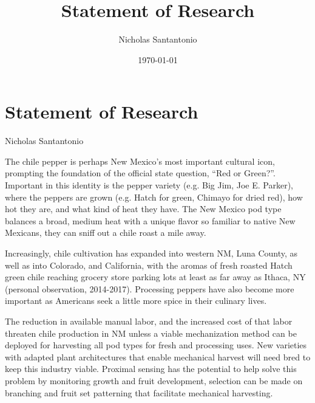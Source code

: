 \documentclass[11pt]{article}
\title{Statement of Research}
\author{Nicholas Santantonio}
\date{\today}
\begin{document}
\section*{\centering Statement of Research}
\begin{center} Nicholas Santantonio \end{center}







\noindent The chile pepper is perhaps New Mexico's most important cultural icon, prompting the foundation of the official state question, ``Red or Green?''. Important in this identity is the pepper variety (e.g. Big Jim, Joe E. Parker), where the peppers are grown (e.g. Hatch for green, Chimayo for dried red), how hot they are, and what kind of heat they have. The New Mexico pod type balances a broad, medium heat with a unique flavor so familiar to native New Mexicans, they can sniff out a chile roast a mile away. 

Increasingly, chile cultivation has expanded into western NM, Luna County, as well as into Colorado, and California, with the aromas of fresh roasted Hatch green chile reaching grocery store parking lots at least as far away as Ithaca, NY (personal observation, 2014-2017). Processing peppers have also become more important as Americans seek a little more spice in their culinary lives. 

The reduction in available manual labor, and the increased cost of that labor threaten chile production in NM unless a viable mechanization method can be deployed for harvesting all pod types for fresh and processing uses. New varieties with adapted plant architectures that enable mechanical harvest  will need bred to keep this industry viable. Proximal sensing has the potential to help solve this problem by monitoring growth and fruit development, selection can be made on branching and fruit set patterning that facilitate mechanical harvesting. 
\end{document}
